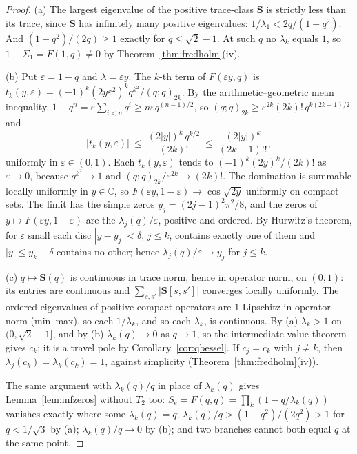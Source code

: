 \documentclass[11pt]{article}
\theoremstyle{plain}
\theoremstyle{definition}
\theoremstyle{remark}
\newcommand{\C}{\mathbb{C}}
\begin{document}
\begin{proof}
(a) The largest eigenvalue of the positive trace-class $\mathbf S$ is strictly less than its trace,
since $\mathbf S$ has infinitely many positive eigenvalues: $1/\lambda_1<2q/(1-q^2)$. And
$(1-q^2)/(2q)\ge1$ exactly for $q\le\sqrt2-1$. At such $q$ no $\lambda_k$ equals $1$, so
$1-\Sigma_1=F(1,q)\ne0$ by Theorem~\ref{thm:fredholm}\textup{(iv)}.

(b) Put $\varepsilon=1-q$ and $\lambda=\varepsilon y$. The $k$-th term of $F(\varepsilon y,q)$ is
$t_k(y,\varepsilon)=(-1)^k(2y\varepsilon^2)^kq^{k^2}/(q;q)_{2k}$. By the arithmetic--geometric mean
inequality, $1-q^n=\varepsilon\sum_{i<n}q^i\ge n\varepsilon q^{(n-1)/2}$, so
$(q;q)_{2k}\ge\varepsilon^{2k}(2k)!\,q^{k(2k-1)/2}$ and
\[
   |t_k(y,\varepsilon)|\ \le\ \frac{(2|y|)^k\,q^{k/2}}{(2k)!}\ \le\ \frac{(2|y|)^k}{(2k-1)!!},
\]
uniformly in $\varepsilon\in(0,1)$. Each $t_k(y,\varepsilon)$ tends to $(-1)^k(2y)^k/(2k)!$ as
$\varepsilon\to0$, because $q^{k^2}\to1$ and $(q;q)_{2k}/\varepsilon^{2k}\to(2k)!$. The domination
is summable locally uniformly in $y\in\C$, so $F(\varepsilon y,1-\varepsilon)\to\cos\sqrt{2y}$
uniformly on compact sets. The limit has the simple zeros $y_j=(2j-1)^2\pi^2/8$, and the zeros of
$y\mapsto F(\varepsilon y,1-\varepsilon)$ are the $\lambda_j(q)/\varepsilon$, positive and ordered.
By Hurwitz's theorem, for $\varepsilon$ small each disc $|y-y_j|<\delta$, $j\le k$, contains exactly
one of them and $|y|\le y_k+\delta$ contains no other; hence $\lambda_j(q)/\varepsilon\to y_j$ for
$j\le k$.

(c) $q\mapsto\mathbf S(q)$ is continuous in trace norm, hence in operator norm, on $(0,1)$: its
entries are continuous and $\sum_{s,s'}|\mathbf S[s,s']|$ converges locally uniformly. The ordered
eigenvalues of positive compact operators are $1$-Lipschitz in operator norm (min--max), so each
$1/\lambda_k$, and so each $\lambda_k$, is continuous. By (a) $\lambda_k>1$ on $(0,\sqrt2-1]$, and by
(b) $\lambda_k(q)\to0$ as $q\to1$, so the intermediate value theorem gives $c_k$; it is a travel pole
by Corollary~\ref{cor:qbessel}. If $c_j=c_k$ with $j\ne k$, then $\lambda_j(c_k)=\lambda_k(c_k)=1$,
against simplicity (Theorem~\ref{thm:fredholm}\textup{(iv)}).

The same argument with $\lambda_k(q)/q$ in place of $\lambda_k(q)$ gives Lemma~\ref{lem:infzeros}
without $T_2$ too: $S_e=F(q,q)=\prod_k(1-q/\lambda_k(q))$ vanishes exactly where some
$\lambda_k(q)=q$; $\lambda_k(q)/q>(1-q^2)/(2q^2)>1$ for $q<1/\sqrt3$ by (a); $\lambda_k(q)/q\to0$ by
(b); and two branches cannot both equal $q$ at the same point.
\end{proof}
\end{document}
